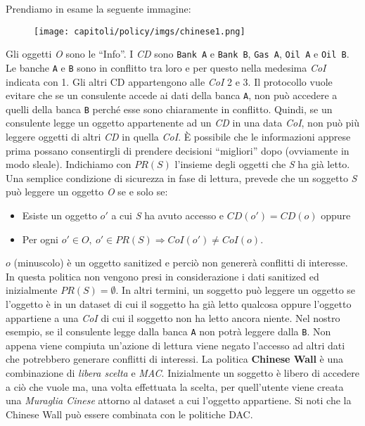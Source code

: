 Prendiamo in esame la seguente immagine:

\begin{figure}[H]
    \centering
    \texttt{[image: capitoli/policy/imgs/chinese1.png]}
\end{figure}

Gli oggetti \textit{O} sono le ``Info''. I \textit{CD} sono \verb|Bank A|
e \verb|Bank B|, \verb|Gas A|, \verb|Oil A| e \verb|Oil B|.
Le banche \verb|A| e \verb|B| sono
in conflitto tra loro e per questo nella
medesima \textit{CoI} indicata con 1. Gli altri CD
appartengono alle \textit{CoI} 2 e 3.
Il protocollo vuole evitare che se un
consulente accede ai dati della banca \verb|A|, non
può accedere a quelli della banca \verb|B| perché
esse sono chiaramente in conflitto.
Quindi, se un consulente legge un oggetto appartenente ad un \textit{CD} in una
data \textit{CoI}, non può più
leggere oggetti di altri \textit{CD} in quella \textit{CoI}.
È possibile che le informazioni apprese prima possano consentirgli di prendere
decisioni ``migliori'' dopo (ovviamente in modo sleale).
Indichiamo con \(PR(S)\) l'insieme degli oggetti che \textit{S} ha già letto.
Una semplice condizione di sicurezza in fase di lettura, prevede che un soggetto
\textit{S} può leggere un
oggetto \textit{O} se e solo se:

\begin{itemize}
    \item Esiste un oggetto \(o'\) a cui \textit{S} ha avuto accesso e
          \(CD(o') = CD(o)\) oppure
    \item Per ogni \(o' \in O, \ o' \in PR(S) \Rightarrow CoI(o') \neq CoI(o)\).
\end{itemize}

\(o\) (minuscolo) è un oggetto sanitized e perciò non genererà conflitti di
interesse.
In questa politica non vengono presi in considerazione i dati sanitized ed
inizialmente \(PR(S) = \emptyset \).
In altri termini, un soggetto può leggere un oggetto se l'oggetto è in un dataset
di cui il soggetto ha
già letto qualcosa oppure l'oggetto appartiene a una \textit{CoI} di cui il
soggetto non ha letto ancora niente. Nel nostro esempio, se il consulente legge
dalla banca \verb|A| non potrà leggere dalla \verb|B|. Non
appena viene compiuta un'azione di lettura viene negato l'accesso ad altri dati
che potrebbero generare conflitti di interessi.
La politica \textbf{Chinese Wall} è una combinazione di \textit{libera scelta} e
\textit{MAC}. Inizialmente un soggetto è
libero di accedere a ciò che vuole ma, una volta effettuata la scelta, per
quell'utente viene creata una \textit{Muraglia Cinese} attorno al dataset a cui
l'oggetto appartiene.
Si noti che la Chinese Wall può essere combinata con le politiche DAC.

